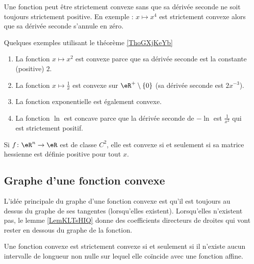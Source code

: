 \begin{remark}
    Une fonction peut être strictement convexe sans que sa dérivée seconde ne soit toujours strictement positive. En exemple : \( x\mapsto x^4\) est strictement convexe alors que sa dérivée seconde s'annule en zéro.
\end{remark}

\begin{example} \label{ExPDRooZCtkOz}
    Quelques exemples utilisant le théorème \ref{ThoGXjKeYb}
    \begin{enumerate}
        \item
    La fonction \( x\mapsto x^2\) est convexe parce que sa dérivée seconde est la constante (positive) \( 2\).
\item La fonction \( x\mapsto\frac{1}{ x }\) est convexe sur \( \eR^+\setminus\{ 0 \}\) (sa dérivée seconde est \( 2x^{-3}\)).
\item
    La fonction exponentielle est également convexe.
\item
    La fonction \( \ln\) est concave parce que la dérivée seconde de \( -\ln\) est \( \frac{1}{ x^2 }\) qui est strictement positif.
    \end{enumerate}
\end{example}

\begin{proposition} \label{PropHRLooTqIJPS}
    Si \( f\colon \eR^n\to \eR\) est de classe \( C^2\), elle est convexe si et seulement si sa matrice hessienne est définie positive pour tout \( x\).
\end{proposition}

\subsection{Graphe d'une fonction convexe}

L'idée principale du graphe d'une fonction convexe est qu'il est toujours au dessus du graphe de ses tangentes (lorsqu'elles existent). Lorsqu'elles n'existent pas, le lemme \ref{LemKLTsHIQ} donne des coefficients directeurs de droites qui vont rester en dessous du graphe de la fonction.

\begin{proposition}      \label{PROPooOCOEooEGybmS}
    Une fonction convexe est strictement convexe si et seulement si il n'existe aucun intervalle de longueur non nulle sur lequel elle coïncide avec une fonction affine.
\end{proposition}

